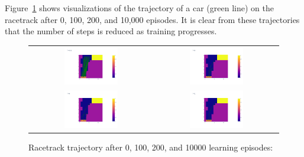 Figure~\ref{fig:racetrackresults} shows visualizations of the trajectory of a car (green line) on the racetrack after 0, 100, 200, and 10,000 episodes. It is clear from these trajectories that the number of steps is reduced as training progresses.

\begin{figure}
\centering

\begin{tabular}{cc}
\includegraphics[width=0.45\textwidth]{rl_into/racetrack/racetrack_iteration_0.png} &
\includegraphics[width=0.45\textwidth]{rl_into/racetrack/racetrack_iteration_100.png} \\
\includegraphics[width=0.45\textwidth]{rl_into/racetrack/racetrack_iteration_200.png} &
\includegraphics[width=0.45\textwidth]{rl_into/racetrack/racetrack_iteration_10000.png}
\end{tabular}
\caption{Racetrack trajectory after 0, 100, 200, and 10000 learning episodes:
}
\label{fig:racetrackresults}
\end{figure}

